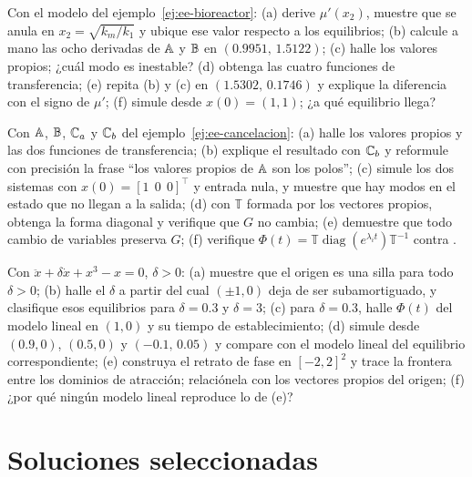 \begin{problema}[bioreactor]\label{prob:ee-bioreactor}
Con el modelo del ejemplo~\ref{ej:ee-bioreactor}: (a) derive $\mu'(x_2)$, muestre que se anula en $x_2=\sqrt{k_m/k_1}$ y ubique ese valor respecto a los equilibrios; (b) calcule a mano las ocho derivadas de $\mathbb{A}$ y $\mathbb{B}$ en $(0.9951,\,1.5122)$; (c) halle los valores propios; ¿cuál modo es inestable? (d) \etiquetaM{} obtenga las cuatro funciones de transferencia; (e) repita (b) y (c) en $(1.5302,\,0.1746)$ y explique la diferencia con el signo de $\mu'$; (f) \etiquetaM{} simule desde $x(0)=(1,1)$; ¿a qué equilibrio llega?
\end{problema}

\begin{problema}\label{prob:ee-cancelacion}
Con $\mathbb{A}$, $\mathbb{B}$, $\mathbb{C}_a$ y $\mathbb{C}_b$ del ejemplo~\ref{ej:ee-cancelacion}: (a) halle los valores propios y las dos funciones de transferencia; (b) explique el resultado con $\mathbb{C}_b$ y reformule con precisión la frase ``los valores propios de $\mathbb{A}$ son los polos''; (c) \etiquetaM{} simule los dos sistemas con $x(0)=[1\;\,0\;\,0]^\top$ y entrada nula, y muestre que hay modos en el estado que no llegan a la salida; (d) con $\mathbb T$ formada por los vectores propios, obtenga la forma diagonal y verifique que $G$ no cambia; (e) demuestre que todo cambio de variables preserva $G$; (f) \etiquetaM{} verifique $\Phi(t)=\mathbb T\operatorname{diag}(e^{\lambda_it})\mathbb T^{-1}$ contra .
\end{problema}

\begin{problema}[Duffing]\label{prob:ee-duffing}
Con $\ddot x+\delta\dot x+x^3-x=0$, $\delta>0$: (a) muestre que el origen es una silla para todo $\delta>0$; (b) halle el $\delta$ a partir del cual $(\pm1,0)$ deja de ser subamortiguado, y clasifique esos equilibrios para $\delta=0.3$ y $\delta=3$; (c) para $\delta=0.3$, halle $\Phi(t)$ del modelo lineal en $(1,0)$ y su tiempo de establecimiento; (d) \etiquetaM{} simule desde $(0.9,0)$, $(0.5,0)$ y $(-0.1,\,0.05)$ y compare con el modelo lineal del equilibrio correspondiente; (e) \etiquetaEstrella{} construya el retrato de fase en $[-2,2]^2$ y trace la frontera entre los dominios de atracción; relaciónela con los vectores propios del origen; (f) ¿por qué ningún modelo lineal reproduce lo de (e)?
\end{problema}

\section{Soluciones seleccionadas}

